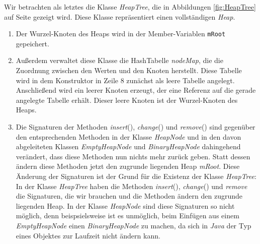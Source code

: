 Wir betrachten als letztes die
Klasse \textsl{HeapTree}, die in Abbildungen \ref{fig:HeapTree} auf Seite
\pageref{fig:HeapTree} gezeigt wird.  Diese Klasse repr\"asentiert einen vollst\"andigen
\textsl{Heap}.  
\begin{enumerate}
\item Der Wurzel-Knoten  des Heaps wird in der Member-Variablen \texttt{mRoot}
      gepeichert. 
\item Au{\ss}erdem verwaltet diese Klasse die HashTabelle \textsl{nodeMap}, die
      die Zuordnung zwischen den Werten und den Knoten herstellt.  Diese Tabelle
      wird in dem Konstruktor in Zeile 8 zun\"achst als leere Tabelle angelegt.
      Anschlie{\ss}end wird ein leerer Knoten erzeugt, der eine Referenz auf die
      gerade angelegte Tabelle erh\"alt.  Dieser leere Knoten ist der Wurzel-Knoten
      des Heaps.
\item Die Signaturen der Methoden \textsl{insert}(), \textsl{change}() und
      \textsl{remove}() sind gegen\"uber den entsprechenden Methoden in der Klasse
      \textsl{HeapNode} und in den davon abgeleiteten Klassen
      \textsl{EmptyHeapNode} und \textsl{BinaryHeapNode} dahingehend ver\"andert,
      dass diese Methoden nun nichts mehr zur\"uck geben. Statt dessen \"andern
      diese Methoden jetzt den zugrunde liegenden Heap \textsl{mRoot}.  Diese
      Änderung der Signaturen ist der Grund f\"ur die Existenz der Klasse
      \textsl{HeapTree}: In der Klasse \textsl{HeapTree} haben die Methoden
      \textsl{insert}(), \textsl{change}() und \textsl{remove} die Signaturen,
      die wir brauchen und die Methoden \"andern den zugrunde liegenden Heap.  
      In der Klasse \textsl{HeapNode} sind diese Signaturen so nicht m\"oglich,
      denn beispsielsweise ist es unm\"oglich, beim Einf\"ugen aus einem
      \textsl{EmptyHeapNode} einen \textsl{BinaryHeapNode} zu machen, da sich in
      \textsl{Java} der Typ eines Objektes zur Laufzeit nicht \"andern kann.
\end{enumerate}

